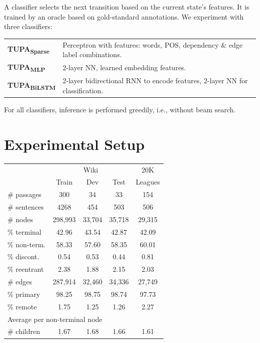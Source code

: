 \documentclass[a0,portrait]{a0poster}
\newcommand{\parser}[1]{TUPA\textsubscript{#1}}
\begin{document}
\begin{multicols}{2}
\vspace{5mm}
A classifier selects the next transition based on the current state's features.
It is trained by an oracle based on gold-standard annotations.
We experiment with three classifiers:
\begin{flushleft}
	\begin{tabular}{ll}
	\textbf{\parser{Sparse}} & Perceptron with features: words, POS, dependency \& edge label combinations. \\
	\textbf{\parser{MLP}} & 2-layer NN, learned embedding features. \\
	\textbf{\parser{BiLSTM}} & 2-layer bidirectional RNN to encode features, 2-layer NN for classification. \\
	\end{tabular}
\end{flushleft}
\vspace{5mm}
For all classifiers, inference is performed greedily, i.e., without beam search.




\section*{Experimental Setup}

\begin{table}
	\vspace{-2cm}
	\begin{tabular}{l|ccc|c}
		& \multicolumn{3}{c|}{Wiki} & 20K \\
		& \small Train & \small Dev & \small Test & Leagues \\
		\hline
		\# passages & 300 & 34 & 33 & 154 \\
		\# sentences & 4268 & 454 & 503 & 506 \\
		\hline
		\# nodes & 298,993 & 33,704 & 35,718 & 29,315 \\
		\% terminal & 42.96 & 43.54 & 42.87 & 42.09 \\
		\% non-term. & 58.33 & 57.60 & 58.35 & 60.01 \\
		\% discont. & 0.54 & 0.53 & 0.44 & 0.81 \\
		\% reentrant & 2.38 & 1.88 & 2.15 & 2.03 \\
		\hline
		\# edges & 287,914 & 32,460 & 34,336 & 27,749 \\
		\% primary & 98.25 & 98.75 & 98.74 & 97.73 \\
		\% remote & 1.75 & 1.25 & 1.26 & 2.27 \\
		\hline
		\multicolumn{3}{l}{\footnotesize Average per non-terminal node} \\
		\# children & 1.67 & 1.68 & 1.66 & 1.61 
	\end{tabular}
\end{table}


\end{multicols}
\end{document}
